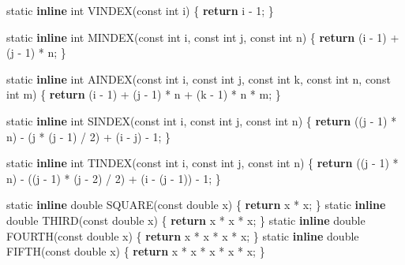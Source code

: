 \documentclass[12pt,]{article}
\newenvironment{Shaded}{\begin{snugshade}}{\end{snugshade}}
\newcommand{\KeywordTok}[1]{\textcolor[rgb]{0.13,0.29,0.53}{\textbf{#1}}}
\newcommand{\DataTypeTok}[1]{\textcolor[rgb]{0.13,0.29,0.53}{#1}}
\newcommand{\DecValTok}[1]{\textcolor[rgb]{0.00,0.00,0.81}{#1}}
\newcommand{\ControlFlowTok}[1]{\textcolor[rgb]{0.13,0.29,0.53}{\textbf{#1}}}
\newcommand{\NormalTok}[1]{#1}
\begin{document}
\begin{Shaded}
\begin{Highlighting}[]
\DataTypeTok{static} \KeywordTok{inline} \DataTypeTok{int}\NormalTok{ VINDEX(}\DataTypeTok{const} \DataTypeTok{int}\NormalTok{ i) \{ }\ControlFlowTok{return}\NormalTok{ i - }\DecValTok{1}\NormalTok{; \}}

\DataTypeTok{static} \KeywordTok{inline} \DataTypeTok{int}\NormalTok{ MINDEX(}\DataTypeTok{const} \DataTypeTok{int}\NormalTok{ i, }\DataTypeTok{const} \DataTypeTok{int}\NormalTok{ j, }\DataTypeTok{const} \DataTypeTok{int}\NormalTok{ n) \{}
    \ControlFlowTok{return}\NormalTok{ (i - }\DecValTok{1}\NormalTok{) + (j - }\DecValTok{1}\NormalTok{) * n;}
\NormalTok{\}}

\DataTypeTok{static} \KeywordTok{inline} \DataTypeTok{int}\NormalTok{ AINDEX(}\DataTypeTok{const} \DataTypeTok{int}\NormalTok{ i, }\DataTypeTok{const} \DataTypeTok{int}\NormalTok{ j, }\DataTypeTok{const} \DataTypeTok{int}\NormalTok{ k, }\DataTypeTok{const} \DataTypeTok{int}\NormalTok{ n,}
                         \DataTypeTok{const} \DataTypeTok{int}\NormalTok{ m) \{}
    \ControlFlowTok{return}\NormalTok{ (i - }\DecValTok{1}\NormalTok{) + (j - }\DecValTok{1}\NormalTok{) * n + (k - }\DecValTok{1}\NormalTok{) * n * m;}
\NormalTok{\}}

\DataTypeTok{static} \KeywordTok{inline} \DataTypeTok{int}\NormalTok{ SINDEX(}\DataTypeTok{const} \DataTypeTok{int}\NormalTok{ i, }\DataTypeTok{const} \DataTypeTok{int}\NormalTok{ j, }\DataTypeTok{const} \DataTypeTok{int}\NormalTok{ n) \{}
    \ControlFlowTok{return}\NormalTok{ ((j - }\DecValTok{1}\NormalTok{) * n) - (j * (j - }\DecValTok{1}\NormalTok{) / }\DecValTok{2}\NormalTok{) + (i - j) - }\DecValTok{1}\NormalTok{;}
\NormalTok{\}}

\DataTypeTok{static} \KeywordTok{inline} \DataTypeTok{int}\NormalTok{ TINDEX(}\DataTypeTok{const} \DataTypeTok{int}\NormalTok{ i, }\DataTypeTok{const} \DataTypeTok{int}\NormalTok{ j, }\DataTypeTok{const} \DataTypeTok{int}\NormalTok{ n) \{}
    \ControlFlowTok{return}\NormalTok{ ((j - }\DecValTok{1}\NormalTok{) * n) - ((j - }\DecValTok{1}\NormalTok{) * (j - }\DecValTok{2}\NormalTok{) / }\DecValTok{2}\NormalTok{) + (i - (j - }\DecValTok{1}\NormalTok{)) - }\DecValTok{1}\NormalTok{;}
\NormalTok{\}}

\DataTypeTok{static} \KeywordTok{inline} \DataTypeTok{double}\NormalTok{ SQUARE(}\DataTypeTok{const} \DataTypeTok{double}\NormalTok{ x) \{ }\ControlFlowTok{return}\NormalTok{ x * x; \}}
\DataTypeTok{static} \KeywordTok{inline} \DataTypeTok{double}\NormalTok{ THIRD(}\DataTypeTok{const} \DataTypeTok{double}\NormalTok{ x) \{ }\ControlFlowTok{return}\NormalTok{ x * x * x; \}}
\DataTypeTok{static} \KeywordTok{inline} \DataTypeTok{double}\NormalTok{ FOURTH(}\DataTypeTok{const} \DataTypeTok{double}\NormalTok{ x) \{ }\ControlFlowTok{return}\NormalTok{ x * x * x * x; \}}
\DataTypeTok{static} \KeywordTok{inline} \DataTypeTok{double}\NormalTok{ FIFTH(}\DataTypeTok{const} \DataTypeTok{double}\NormalTok{ x) \{ }\ControlFlowTok{return}\NormalTok{ x * x * x * x * x; \}}


\end{Highlighting}
\end{Shaded}
\end{document}
